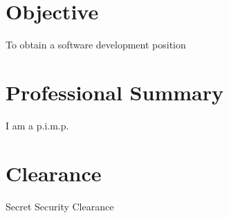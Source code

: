 \documentclass[margin,line]{resume}
\begin{document}
\address{813 Troy Rd\\Edwardsville\\IL 62025 $\bullet$ (618) 530-0659 $\bullet$ jcook@siue.edu}
\begin{resume}
\section{Objective}
To obtain a software development position
\section{Professional Summary}
I am a p.i.m.p.

\section{Clearance}
Secret Security Clearance

\end{resume}
\end{document}
